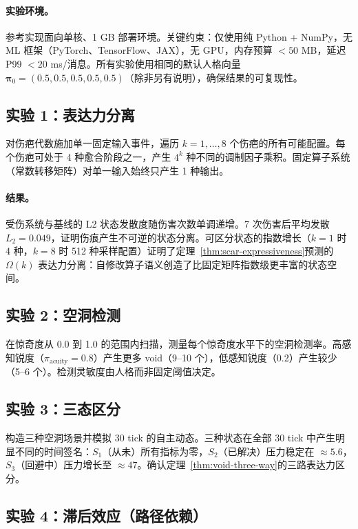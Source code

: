 \documentclass[11pt]{article}
\begin{document}
\paragraph{实验环境。}参考实现面向单核、1 GB 部署环境。关键约束：仅使用纯 Python + NumPy，无 ML 框架（PyTorch、TensorFlow、JAX），无 GPU，内存预算 $< 50$ MB，延迟 P99 $< 20$ ms/消息。所有实验使用相同的默认人格向量 $\boldsymbol{\pi}_0 = (0.5, 0.5, 0.5, 0.5, 0.5)$（除非另有说明），确保结果的可复现性。

\subsection{实验 1：表达力分离}

对伤疤代数施加单一固定输入事件，遍历 $k = 1, \ldots, 8$ 个伤疤的所有可能配置。每个伤疤可处于 4 种愈合阶段之一，产生 $4^k$ 种不同的调制因子乘积。固定算子系统（常数转移矩阵）对单一输入始终只产生 1 种输出。

\paragraph{结果。}受伤系统与基线的 L2 状态发散度随伤害次数单调递增。7 次伤害后平均发散 $L_2 = 0.049$，证明伤痕产生不可逆的状态分离。可区分状态的指数增长（$k=1$ 时 4 种，$k=8$ 时 512 种采样配置）证明了定理~\ref{thm:scar-expressiveness}预测的 $\Omega(k)$ 表达力分离：自修改算子语义创造了比固定矩阵指数级更丰富的状态空间。

\subsection{实验 2：空洞检测}

在惊奇度从 0.0 到 1.0 的范围内扫描，测量每个惊奇度水平下的空洞检测率。高感知锐度（$\pi_{\text{acuity}}=0.8$）产生更多 void（9--10 个），低感知锐度（0.2）产生较少（5--6 个）。检测灵敏度由人格而非固定阈值决定。

\subsection{实验 3：三态区分}

构造三种空洞场景并模拟 30 tick 的自主动态。三种状态在全部 30 tick 中产生明显不同的时间签名：$S_1$（从未）所有指标为零，$S_2$（已解决）压力稳定在 $\approx 5.6$，$S_3$（回避中）压力增长至 $\approx 47$。确认定理~\ref{thm:void-three-way}的三路表达力区分。

\subsection{实验 4：滞后效应（路径依赖）}
\end{document}
